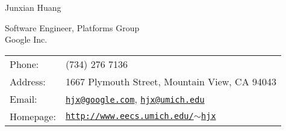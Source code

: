 \documentclass[letterpaper]{article}
\def\name{Junxian Huang}
\renewenvironment{itemize}{
  \begin{list}{}{
    \setlength{\leftmargin}{1em}
  }
}{
  \end{list}
}
\begin{document}
{\huge \name}



\begin{minipage}{0.45\linewidth}
  Software Engineer, Platforms Group \\
  Google Inc. \\
\end{minipage}
\begin{minipage}{0.45\linewidth}
  \begin{tabular}{ll}
    Phone: & (734) 276 7136  \\
    Address: & 1667 Plymouth Street, Mountain View, CA 94043\\
    Email: & \href{mailto:hjx@google.com}{\tt hjx@google.com}, \href{mailto:hjx@umich.edu}{\tt hjx@umich.edu} \\
    Homepage: & \href{http://www.eecs.umich.edu/~hjx}{\tt http://www.eecs.umich.edu/$\sim$hjx} \\
  \end{tabular}
\end{minipage}



\end{document}
